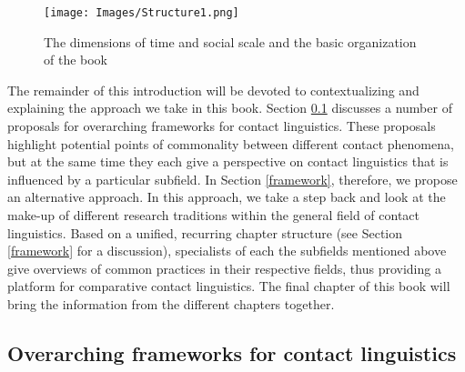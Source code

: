 \begin{figure}[h] 
\caption{The dimensions of time and social scale and the basic organization of the book} \label{fig-structure1}
\centering
\texttt{[image: Images/Structure1.png]}
\end{figure}



The remainder of this introduction will be devoted to contextualizing and explaining the approach we take in this book. Section \ref{sec-connections} discusses a number of proposals for overarching frameworks for contact linguistics. These proposals highlight potential points of commonality between different contact phenomena, but at the same time they each give a perspective on contact linguistics that is influenced by a particular subfield. In Section \ref{framework}, therefore, we propose an alternative approach. In this approach, we take a step back and look at the make-up of different research traditions within the general field of contact linguistics. Based on a unified, recurring chapter structure (see Section \ref{framework} for a discussion), specialists of each the subfields mentioned above give overviews of common practices in their respective fields, thus providing a platform for comparative contact linguistics. The final chapter of this book
will bring the information from the different chapters together.

\subsection{Overarching frameworks for contact linguistics} \label{sec-connections}

